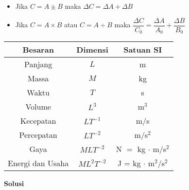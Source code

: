 \documentclass[12pt, a4paper]{article}\usepackage[utf8]{inputenc}
\theoremstyle{definition}
\theoremstyle{definition}
\begin{document}
	 \begin{itemize}
	 	\item Jika $C = A \pm B$ maka $\Delta C = \Delta A + \Delta B$
	 	\item Jika $C = A \times B$ atau $C = A \div B$ maka $\dfrac{\Delta C}{C_0} = \dfrac{\Delta A}{A_0} + \dfrac{\Delta B}{B_0}$
	 \end{itemize}
 	
 	\vspace{3em}
 	
 	\begin{center}
 		\begin{tabular}{c|c|c}
 			Besaran & Dimensi & Satuan SI\\
 			\hline
 			Panjang & $L$ & m\\
 			Massa & $M$ & kg\\
 			Waktu & $T$ & s\\
 			Volume & $L^3$ & m$^3$\\
 			Kecepatan & $LT^{-1}$ & m/s\\
 			Percepatan & $LT^{-2}$ & m/s$^2$\\
 			Gaya & $MLT^{-2}$ & N $=$ kg $\cdot$ m/s$^2$\\
 			Energi dan Usaha & $ML^2T^{-2}$ & J = kg $\cdot$ m$^2$/s$^2$\\
 		\end{tabular}
 		
 	\end{center}
 
 	\pagebreak
 	
 			\begin{center}
 			\textbf{\Large Solusi}
 		\end{center}
 	
 	
	
	
\end{document}

